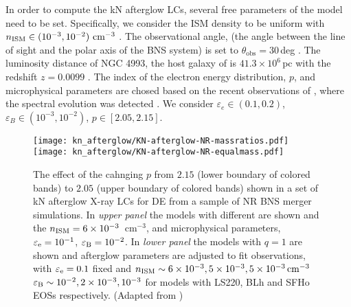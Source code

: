 In order to compute the \ac{kN} afterglow \acp{LC}, several free parameters of the model
need to be set. Specifically, we consider the \ac{ISM} density to be uniform with 
$n_{\text{ISM}}\in(10^{-3}, 10^{-2})\,\,\text{cm}^{-3}$ \citep{Hajela:2019mjy}. 
The observational angle, (the angle between the line of sight and the polar axis of the 
\ac{BNS} system) is set to $\theta_{\text{obs}}=30\,$deg \citep{TheLIGOScientific:2017qsa}.
The luminosity distance of NGC 4993, the host galaxy of \GW{} is  $41.3\times10^{6}\,$pc 
with the redshift $z=0.0099$ \citep{Hjorth:2017yza}.
%
The index of the electron energy distribution, $p$, and microphysical parameters are 
chosed based on the recent observations of \GRB{}, where the spectral evolution 
was detected \citep{Hajela:2021faz}.  
%
We consider 
$\varepsilon_e\in(0.1, 0.2)$,
$\varepsilon_B\in(10^{-3}, 10^{-2})$, 
$p\in[2.05,2.15]$.

\begin{figure}
    \begin{center}
        \texttt{[image: kn\_afterglow/KN-afterglow-NR-massratios.pdf]}
        \texttt{[image: kn\_afterglow/KN-afterglow-NR-equalmass.pdf]}
        \caption{
            The effect of the cahnging $p$ from $2.15$ (lower boundary of colored bands) to 
            $2.05$ (upper boundary of colored bands) shown in a set of \ac{kN} afterglow 
            X-ray \acp{LC} for \ac{DE} from a sample of \ac{NR} \ac{BNS} merger simulations.
            In \emph{upper panel} the models with different \mr{} are shown and the 
            $n_{\text{ISM}}=6\times10^{-3}$~cm$^{-3}$, and microphysical parameters, 
            $\varepsilon_{\rm e}=10^{-1}$, $\varepsilon_{\rm B}=10^{-2}$.
            In \emph{lower panel} the models with $q=1$ are shown and afterglow
            parameters are adjusted to fit observations, 
            with $\varepsilon_{\rm e}=0.1$ fixed and  
            $n_{\text{ISM}}\sim 6\times 10^{-3}, 5\times 10^{-3},5\times 10^{-3}\,\rm{cm^{-3}}$
            $\varepsilon_{\rm B}\sim 10^{-2},2\times 10^{-3},10^{-3}$ for models with 
            LS220, BLh and SFHo \acp{EOS} respectively.
            (Adapted from \citet{Hajela:2021faz})
        } \label{fig:kn_afterglow}
    \end{center}
\end{figure}

